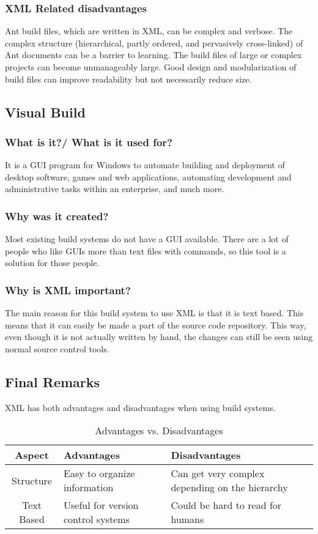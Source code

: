 \subsubsection{XML Related disadvantages}

Ant build files, which are written in XML, can be complex and verbose. The complex structure (hierarchical, partly ordered, and pervasively cross-linked) of Ant documents can be a barrier to learning. The build files of large or complex projects can become unmanageably large. Good design and modularization of build files can improve readability but not necessarily reduce size.

\subsection{Visual Build}
\subsubsection{What is it?/ What is it used for?}

It is a GUI program for Windows to automate building and deployment of desktop software, games and web applications, automating development and administrative tasks within an enterprise, and much more.
\subsubsection{Why was it created?}
Most existing build systems do not have a GUI available. There are a lot of people who like GUIs more than text files with commands, so this tool is a solution for those people.
\subsubsection{Why is XML important?}
The main reason for this build system to use XML is that it is text based. This means that it can easily be made a part of the source code repository. This way, even though it is not actually written by hand, the changes can still be seen using normal source control tools.

\subsection{Final Remarks}

XML has both advantages and disadvantages when using build systems.

\begin{table}
    \begin{tabulary}{\textwidth}{cLL}
        \toprule
       Aspect &  Advantages & Disadvantages \\
        \midrule
    Structure & Easy to organize information & Can get very complex depending on the hierarchy \\
        \midrule
    Text Based & Useful for version control systems & Could be hard to read for humans \\
    \bottomrule
    \end{tabulary}
    \caption{Advantages vs. Disadvantages}
\end{table}

